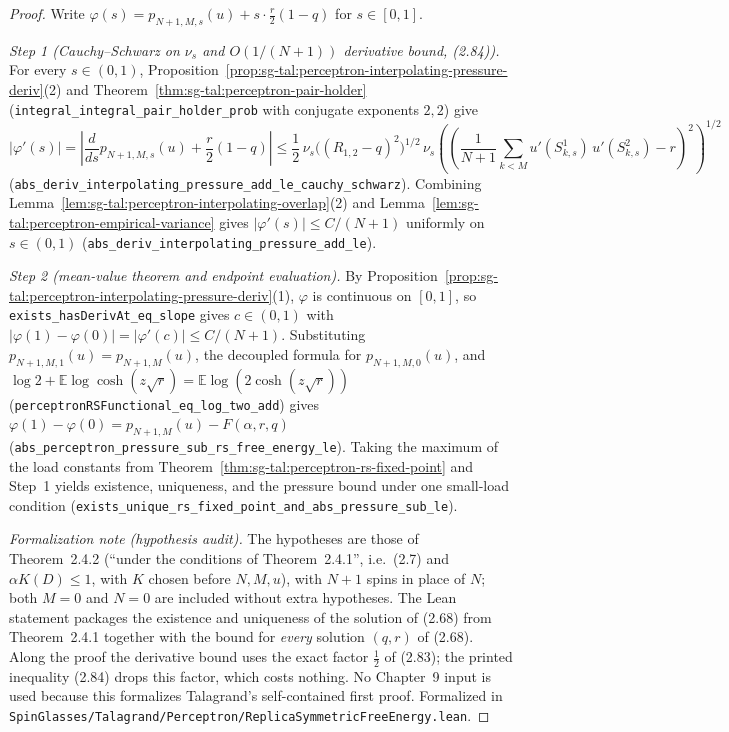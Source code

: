 \begin{proof}
  \leanok
Write $\varphi(s)=p_{N+1,M,s}(u)+s\cdot\frac{r}{2}(1-q)$ for $s\in[0,1]$.

\emph{Step 1 (Cauchy--Schwarz on $\nu_s$ and $O(1/(N+1))$ derivative bound, (2.84)).} For every
$s\in(0,1)$, Proposition~\ref{prop:sg-tal:perceptron-interpolating-pressure-deriv}(2) and
Theorem~\ref{thm:sg-tal:perceptron-pair-holder} (\texttt{integral\_integral\_pair\_holder\_prob}
with conjugate exponents $2,2$) give
\[
 \bigl|\varphi'(s)\bigr|
 =\left|\frac{d}{ds}p_{N+1,M,s}(u)+\frac{r}{2}(1-q)\right|
 \le\frac{1}{2}\,\nu_s\bigl((R_{1,2}-q)^2\bigr)^{1/2}
   \,\nu_s\!\left(\left(\frac{1}{N+1}\sum_{k<M}u'(S_{k,s}^1)\,u'(S_{k,s}^2)-r\right)^2\right)^{1/2}
\]
(\texttt{abs\_deriv\_interpolating\_pressure\_add\_le\_cauchy\_schwarz}). Combining
Lemma~\ref{lem:sg-tal:perceptron-interpolating-overlap}(2) and
Lemma~\ref{lem:sg-tal:perceptron-empirical-variance} gives $|\varphi'(s)|\le C/(N+1)$ uniformly on
$s\in(0,1)$ (\texttt{abs\_deriv\_interpolating\_pressure\_add\_le}).

\emph{Step 2 (mean-value theorem and endpoint evaluation).} By
Proposition~\ref{prop:sg-tal:perceptron-interpolating-pressure-deriv}(1), $\varphi$ is continuous
on $[0,1]$, so \texttt{exists\_hasDerivAt\_eq\_slope} gives $c\in(0,1)$ with
$|\varphi(1)-\varphi(0)|=|\varphi'(c)|\le C/(N+1)$. Substituting $p_{N+1,M,1}(u)=p_{N+1,M}(u)$,
the decoupled formula for $p_{N+1,M,0}(u)$, and $\log 2+\mathbb E\log\cosh(z\sqrt r)
=\mathbb E\log(2\cosh(z\sqrt r))$ (\texttt{perceptronRSFunctional\_eq\_log\_two\_add}) gives
$\varphi(1)-\varphi(0)=p_{N+1,M}(u)-F(\alpha,r,q)$
(\texttt{abs\_perceptron\_pressure\_sub\_rs\_free\_energy\_le}). Taking the maximum of the load
constants from Theorem~\ref{thm:sg-tal:perceptron-rs-fixed-point} and Step~1 yields existence,
uniqueness, and the pressure bound under one small-load condition
(\texttt{exists\_unique\_rs\_fixed\_point\_and\_abs\_pressure\_sub\_le}).

\emph{Formalization note (hypothesis audit).} The hypotheses are those of Theorem~2.4.2 (``under the conditions of
Theorem~2.4.1'', i.e.\ (2.7) and $\alpha K(D)\le1$, with $K$ chosen before $N,M,u$), with $N+1$ spins in place of $N$; both $M=0$ and
$N=0$ are included without extra hypotheses. The Lean statement packages the existence and uniqueness of the solution of (2.68) from Theorem~2.4.1 together with the
bound for \emph{every} solution $(q,r)$ of (2.68). Along the proof the derivative bound uses the exact factor $\tfrac12$ of (2.83); the
printed inequality (2.84) drops this factor, which costs nothing. No Chapter~9 input is used because this formalizes Talagrand's
self-contained first proof.
Formalized in \texttt{SpinGlasses/Talagrand/Perceptron/ReplicaSymmetricFreeEnergy.lean}.
\end{proof}

